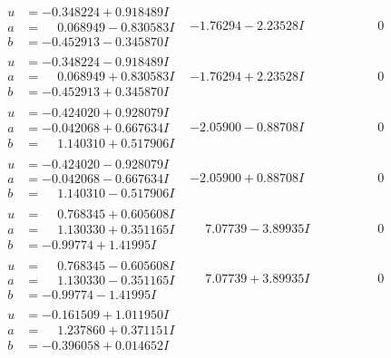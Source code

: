 \documentclass[1p]{elsarticle_modified}
\theoremstyle{definition}
\begin{document}
$$\begin{array}{c|c|c}
 \hline 
\begin{aligned}
u &= -0.348224 + 0.918489 I \\
a &= \phantom{-}0.068949 - 0.830583 I \\
b &= -0.452913 - 0.345870 I\end{aligned}
 & -1.76294 - 2.23528 I & \phantom{-0.000000 } 0 \\ \hline\begin{aligned}
u &= -0.348224 - 0.918489 I \\
a &= \phantom{-}0.068949 + 0.830583 I \\
b &= -0.452913 + 0.345870 I\end{aligned}
 & -1.76294 + 2.23528 I & \phantom{-0.000000 } 0 \\ \hline\begin{aligned}
u &= -0.424020 + 0.928079 I \\
a &= -0.042068 + 0.667634 I \\
b &= \phantom{-}1.140310 + 0.517906 I\end{aligned}
 & -2.05900 - 0.88708 I & \phantom{-0.000000 } 0 \\ \hline\begin{aligned}
u &= -0.424020 - 0.928079 I \\
a &= -0.042068 - 0.667634 I \\
b &= \phantom{-}1.140310 - 0.517906 I\end{aligned}
 & -2.05900 + 0.88708 I & \phantom{-0.000000 } 0 \\ \hline\begin{aligned}
u &= \phantom{-}0.768345 + 0.605608 I \\
a &= \phantom{-}1.130330 + 0.351165 I \\
b &= -0.99774 + 1.41995 I\end{aligned}
 & \phantom{-}7.07739 - 3.89935 I & \phantom{-0.000000 } 0 \\ \hline\begin{aligned}
u &= \phantom{-}0.768345 - 0.605608 I \\
a &= \phantom{-}1.130330 - 0.351165 I \\
b &= -0.99774 - 1.41995 I\end{aligned}
 & \phantom{-}7.07739 + 3.89935 I & \phantom{-0.000000 } 0 \\ \hline\begin{aligned}
u &= -0.161509 + 1.011950 I \\
a &= \phantom{-}1.237860 + 0.371151 I \\
b &= -0.396058 + 0.014652 I\end{aligned}

\end{array}$$
\end{document}
